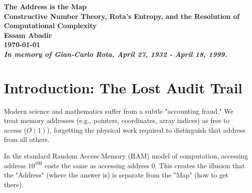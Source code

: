 \documentclass{report}
\begin{document}
\begin{titlepage}
    \centering
    \vspace*{\fill}
    \Huge\bfseries The Address is the Map\\
    \Large Constructive Number Theory, Rota's Entropy, and the Resolution of Computational Complexity\\
    \vspace{1cm}
    \Large Essam Abadir\\
    \vspace{1cm}
    \large \today\\

    \vspace{3cm}
    \normalfont \emph{In memory of Gian-Carlo Rota, April 27, 1932 - April 18, 1999.}
    \vspace*{\fill}
\end{titlepage}


\begin{abstract}
In standard computational theory, the "address" of a solution (its location in a search space) is assumed to be distinct from the "work" required to find it. This assumption leads to the $P$ vs $NP$ paradox, where verifying a solution is easy but finding it appears hard. This paper presents \textbf{Electronic Graph Paper Theory (EGPT)}, a constructive number theory formalized in the Lean 4 proof assistant. By rigorously applying Gian-Carlo Rota's Entropy Theorem (RET), we demonstrate that numbers are not static scalars but dynamic histories of events. In this framework, the information required to \textit{specify} a unique address (via optimal Shannon coding/prime factorization) is formally identical to the information required to \textit{compute} it. Consequently, $P=NP$ emerges not as a magic algorithm, but as a conservation law of information: one cannot specify a problem's solution-address without implicitly providing the map to reach it.
\end{abstract}

\section{Introduction: The Lost Audit Trail}

Modern science and mathematics suffer from a subtle "accounting fraud." We treat memory addresses (e.g., pointers, coordinates, array indices) as free to access ($O(1)$), forgetting the physical work required to distinguish that address from all others.

In the standard Random Access Memory (RAM) model of computation, accessing address $10^{100}$ costs the same as accessing address $0$. This creates the illusion that the "Address" (where the answer is) is separate from the "Map" (how to get there).
\end{document}
